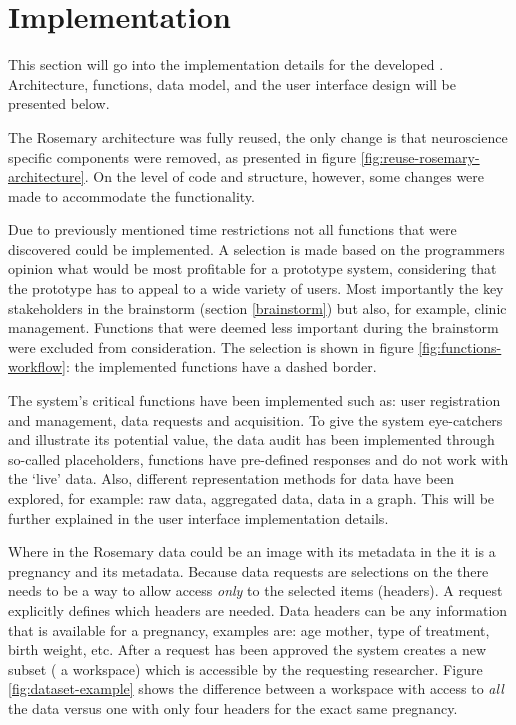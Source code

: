 \section{\ivfprototype{} Implementation}
\label{implementation}

This section will go into the implementation details for the developed \ivfprototype{}.
Architecture, functions, data model, and the user interface design will be presented below.

The Rosemary architecture was fully reused, the only change is that neuroscience specific components were removed, as presented in figure \ref{fig:reuse-rosemary-architecture}.
On the level of code and structure, however, some changes were made to accommodate the \ivfprototype{} functionality.

Due to previously mentioned time restrictions not all functions that were discovered could be implemented.
A selection is made based on the programmers opinion what would be most profitable for a prototype system, considering that the prototype has to appeal to a wide variety of users.
Most importantly the key stakeholders in the brainstorm (section \ref{brainstorm}) but also, for example, clinic management.
Functions that were deemed less important during the brainstorm were excluded from consideration.
The selection is shown in figure \ref{fig:functions-workflow}: the implemented functions have a dashed border.

The system's critical functions have been implemented such as: user registration and management, data requests and acquisition.
To give the system eye-catchers and illustrate its potential value, the data audit has been implemented through so-called placeholders, \ie{} functions have pre-defined responses and do not work with the `live' data.
Also, different representation methods for data have been explored, for example: raw data, aggregated data, data in a graph.
This will be further explained in the user interface implementation details.

Where in the Rosemary data could be an image with its metadata in the \ivfprototype{} it is a pregnancy and its metadata.
Because data requests are selections on the \projectdata{} there needs to be a way to allow access \emph{only} to the selected items (headers).
A request explicitly defines which headers are needed.
Data headers can be any information that is available for a pregnancy, examples are: age mother, type of treatment, birth weight, etc.
After a request has been approved the system creates a new subset (\ie{} a workspace) which is accessible by the requesting researcher.
Figure \ref{fig:dataset-example} shows the difference between a workspace with access to \emph{all} the data versus one with only four headers for the exact same pregnancy.

